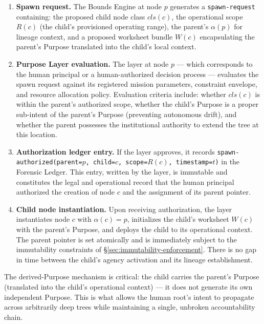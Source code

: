 \begin{enumerate}
\item[$\mathbf{S_1}$] \textbf{Spawn request.} The Bounds Engine at node $p$ generates a \texttt{spawn-request} containing: the proposed child node class $cls(c)$, the operational scope $R(c)$ (the child's provisioned operating range), the parent's $\alpha(p)$ for lineage context, and a proposed worksheet bundle $W(c)$ encapsulating the parent's Purpose translated into the child's local context.

\item[$\mathbf{S_2}$] \textbf{Purpose Layer evaluation.} The \purpose{} layer at node $p$ — which corresponds to the human principal or a human-authorized decision process — evaluates the spawn request against its registered mission parameters, constraint envelope, and resource allocation policy. Evaluation criteria include: whether $cls(c)$ is within the parent's authorized scope, whether the child's Purpose is a proper sub-intent of the parent's Purpose (preventing autonomous drift), and whether the parent possesses the institutional authority to extend the tree at this location.

\item[$\mathbf{S_3}$] \textbf{Authorization ledger entry.} If the \purpose{} layer approves, it records \texttt{spawn-authorized(parent=$p$, child=$c$, scope=$R(c)$, timestamp=$t$)} in the Forensic Ledger. This entry, written by the \fact{} layer, is immutable and constitutes the legal and operational record that the human principal authorized the creation of node $c$ and the assignment of its parent pointer.

\item[$\mathbf{S_4}$] \textbf{Child node instantiation.} Upon receiving authorization, the \fact{} layer instantiates node $c$ with $\alpha(c) = p$, initializes the child's worksheet $W(c)$ with the parent's Purpose, and deploys the child to its operational context. The parent pointer is set atomically and is immediately subject to the immutability constraints of \S\ref{sec:immutability-enforcement}. There is no gap in time between the child's agency activation and its lineage establishment.
\end{enumerate}

The derived-Purpose mechanism is critical: the child carries the parent's Purpose (translated into the child's operational context) — it does not generate its own independent Purpose. This is what allows the human root's intent to propagate across arbitrarily deep trees while maintaining a single, unbroken accountability chain.

